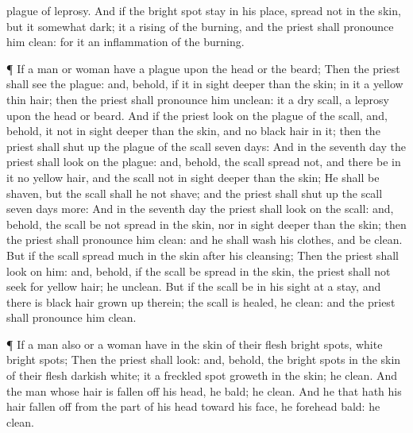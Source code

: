 {plague of
leprosy.
And if the
bright
spot
stay in his place,
{}
spread not in the
skin, but it
{} somewhat
dark; it
{} a
rising of the
burning, and the
priest shall pronounce him
clean: for it
{} an
inflammation of the
burning.
\par }{\PP {}¶ If a
man or
woman have a
plague upon the
head or the
beard;
Then the
priest shall
see the
plague: and, behold, if it
{} in
sight
deeper than the
skin;
{} in it a
yellow
thin
hair; then the
priest shall pronounce him
unclean: it
{} a dry
scall,
{} a
leprosy upon the
head or
beard.
And if the
priest
look on the
plague of the
scall, and, behold, it
{} not in
sight
deeper than the
skin, and
{} no
black
hair in it; then the
priest shall
shut up
{} the
plague of the
scall
seven
days:
And in the
seventh
day the
priest shall
look on the
plague: and, behold,
{} the
scall
spread not, and there be in it no
yellow
hair, and the
scall
{} not in
sight
deeper than the
skin;
He shall be
shaven, but the
scall shall he not
shave; and the
priest shall
shut up
{} the
scall
seven
days
more:
And in the
seventh
day the
priest shall
look on the
scall: and, behold,
{} the
scall be not
spread in the
skin, nor
{} in
sight
deeper than the
skin; then the
priest shall pronounce him
clean: and he shall
wash his
clothes, and be
clean.
But if the
scall
spread
much in the
skin
after his
cleansing;
Then the
priest shall
look on him: and, behold, if the
scall be
spread in the
skin, the
priest shall not
seek for
yellow
hair; he
{}
unclean.
But if the
scall be in his
sight at a
stay, and
{} there is
black
hair
grown up therein; the
scall is
healed, he
{}
clean: and the
priest shall pronounce him
clean.
\par }{\PP {}¶ If a
man also or a
woman have in the
skin of their
flesh bright
spots,
{}
white bright
spots;
Then the
priest shall
look: and, behold,
{} the bright
spots in the
skin of their
flesh
{}
darkish
white; it
{} a freckled
spot
{}
groweth in the
skin; he
{}
clean.
And the
man whose hair is
fallen off his
head, he
{}
bald;
{} he
clean.
And he that hath his hair
fallen off from the
part of his
head toward his
face, he
{} forehead
bald:
{} he
clean.
}
